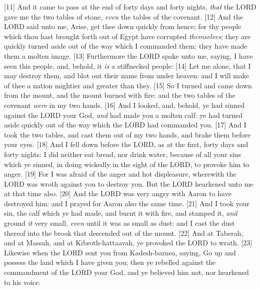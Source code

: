 [11] \textcolor[rgb]{0.00,0.00,1.00}{And it came to pass at the end of forty days and forty nights, \emph{that} the LORD gave me the two tables of stone, \emph{even} the tables of the covenant.}
[12] \textcolor[rgb]{0.00,0.00,1.00}{And the LORD said unto me, Arise, get thee down quickly from hence; for thy people which thou hast brought forth out of Egypt have corrupted \emph{themselves}; they are quickly turned aside out of the way which I commanded them; they have made them a molten image.}
[13] \textcolor[rgb]{0.00,0.00,1.00}{Furthermore the LORD spake unto me, saying, I have seen this people, and, behold, it \emph{is} a stiffnecked people:}
[14] \textcolor[rgb]{0.00,0.00,1.00}{Let me alone, that I may destroy them, and blot out their name from under heaven: and I will make of thee a nation mightier and greater than they.}
[15] \textcolor[rgb]{0.00,0.00,1.00}{So I turned and came down from the mount, and the mount burned with fire: and the two tables of the covenant \emph{were} in my two hands.}
[16] \textcolor[rgb]{0.00,0.00,1.00}{And I looked, and, behold, ye had sinned against the LORD your God, \emph{and} had made you a molten calf: ye had turned aside quickly out of the way which the LORD had commanded you.}
[17] \textcolor[rgb]{0.00,0.00,1.00}{And I took the two tables, and cast them out of my two hands, and brake them before your eyes.}
[18] \textcolor[rgb]{0.00,0.00,1.00}{And I fell down before the LORD, as at the first, forty days and forty nights: I did neither eat bread, nor drink water, because of all your sins which ye sinned, in doing wickedly in the sight of the LORD, to provoke him to anger.}
[19] \textcolor[rgb]{0.00,0.00,1.00}{For I was afraid of the anger and hot displeasure, wherewith the LORD was wroth against you to destroy you. But the LORD hearkened unto me at that time also.}
[20] \textcolor[rgb]{0.00,0.00,1.00}{And the LORD was very angry with Aaron to have destroyed him: and I prayed for Aaron also the same time.}
[21] \textcolor[rgb]{0.00,0.00,1.00}{And I took your sin, the calf which ye had made, and burnt it with fire, and stamped it, \emph{and} ground \emph{it} very small, \emph{even} until it was as small as dust: and I cast the dust thereof into the brook that descended out of the mount.}
[22] \textcolor[rgb]{0.00,0.00,1.00}{And at Taberah, and at Massah, and at Kibroth-hattaavah, ye provoked the LORD to wrath.}
[23] \textcolor[rgb]{0.00,0.00,1.00}{Likewise when the LORD sent you from Kadesh-barnea, saying, Go up and possess the land which I have given you; then ye rebelled against the commandment of the LORD your God, and ye believed him not, nor hearkened to his voice.}
